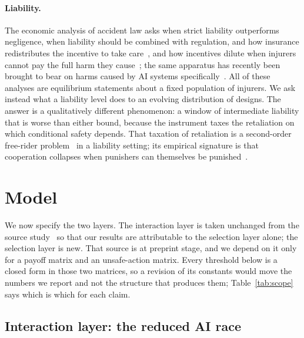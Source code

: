 \documentclass[11pt,a4paper]{article}
\theoremstyle{definition}
\begin{document}
\paragraph{Liability.}
The economic analysis of accident law asks when strict liability outperforms
negligence, when liability should be combined with regulation, and how
insurance redistributes the incentive to take
care~\citep{shavell1980strict,shavell1984model,shavell1982insurance}, and how
incentives dilute when injurers cannot pay the full harm they
cause~\citep{shavell1986judgment}; the
same apparatus has recently been brought to bear on harms caused by AI
systems specifically~\citep{chagalfeferkorn2019algorithm,buiten2023liability,hacker2023liability,weil2024tort}. All of these analyses are
equilibrium
statements about a fixed population of injurers. We ask instead what a
liability level does to an evolving distribution of designs. The answer is a
qualitatively different phenomenon: a window of intermediate liability that is
worse than either bound, because the instrument taxes the retaliation on which
conditional safety depends. That taxation of retaliation is a second-order
free-rider problem~\citep{panchanathan2004secondorder,sigmund2010institutions} in a liability
setting; its empirical signature is that cooperation collapses when punishers
can themselves be punished~\citep{herrmann2008antisocial,nikiforakis2008counterpunishment}.

\section{Model}\label{sec:model}

We now specify the two layers. The interaction layer is taken unchanged from
the source study~\citep{domingos2026falling} so that our results are
attributable to the selection layer alone; the selection layer is new. That
source is at preprint stage, and we depend on it only for a payoff matrix and
an unsafe-action matrix. Every threshold below is a closed form in those two
matrices, so a revision of its constants would move the numbers we report and
not the structure that produces them; Table~\ref{tab:scope} says which is
which for each claim.

\subsection{Interaction layer: the reduced AI race}
\end{document}

